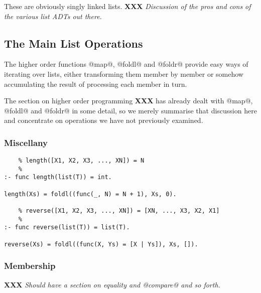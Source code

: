 \documentclass[a4paper,11pt,notitlepage,onecolumn]{article}
\newcommand{\XXX}[1]%
{{\small\textbf{XXX} \emph{#1}}}
\begin{document}
These are obviously singly linked lists.  \XXX{Discussion of the pros
and cons of the various list ADTs out there.}

\subsection{The Main List Operations}

The higher order functions @map@, @foldl@ and @foldr@ provide easy ways
of iterating over lists, either transforming them member by member or
somehow accumulating the result of processing each member in turn.

The section on higher order programming \XXX{} has already dealt with
@map@, @foldl@ and @foldr@ in some detail, so we merely summarise that
discussion here and concentrate on operations we have not previously
examined.

\subsubsection{Miscellany}

\begin{verbatim}
    % length([X1, X2, X3, ..., XN]) = N
    %
:- func length(list(T)) = int.

length(Xs) = foldl((func(_, N) = N + 1), Xs, 0).

    % reverse([X1, X2, X3, ..., XN]) = [XN, ..., X3, X2, X1]
    %
:- func reverse(list(T)) = list(T).

reverse(Xs) = foldl((func(X, Ys) = [X | Ys]), Xs, []).
\end{verbatim}

\subsubsection{Membership}

\XXX{Should have a section on equality and @compare@ and so forth.}
\end{document}
